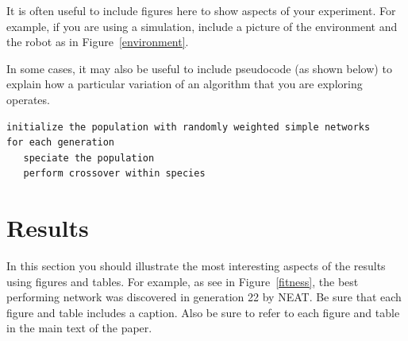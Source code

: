 \documentclass[11pt]{article}
\begin{document}
It is often useful to include figures here to show aspects of your
experiment.  For example, if you are using a simulation, include a
picture of the environment and the robot as in Figure~\ref{environment}.

In some cases, it may also be useful to include pseudocode (as shown
below) to explain how a particular variation of an algorithm that you
are exploring operates.

\begin{verbatim}
initialize the population with randomly weighted simple networks
for each generation
   speciate the population
   perform crossover within species
\end{verbatim}

\section{Results}

In this section you should illustrate the most interesting aspects of
the results using figures and tables.  For example, as see in
Figure~\ref{fitness}, the best performing network was discovered in
generation 22 by NEAT. Be sure that each figure and table includes a
caption.  Also be sure to refer to each figure and table in the main
text of the paper.
\end{document}
